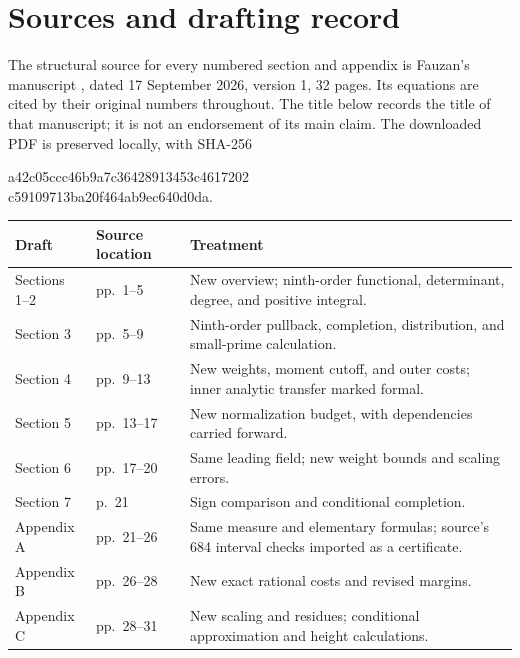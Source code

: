 \begingroup
\small
\section*{Sources and drafting record}

The structural source for every numbered section and appendix is
Fauzan's manuscript \cite{F}, dated 17 September 2026, version 1,
32 pages. Its equations are cited by their original numbers throughout.
The title below records the title of that manuscript; it is not an
endorsement of its main claim. The downloaded PDF is preserved locally,
with SHA-256
\begin{center}\small\ttfamily
a42c05ccc46b9a7c36428913453c4617202\\
c59109713ba20f464ab9ec640d0da.
\end{center}

\begin{center}
\small
\begin{tabular}{@{}>{\raggedright\arraybackslash}p{}>{\raggedright\arraybackslash}p{}>{\raggedright\arraybackslash}p{}@{}}
\toprule
Draft & Source location & Treatment\\
\midrule
Sections 1--2 & pp.~1--5 & New overview; ninth-order functional, determinant, degree, and positive integral.\\
Section 3 & pp.~5--9 & Ninth-order pullback, completion, distribution, and small-prime calculation.\\
Section 4 & pp.~9--13 & New weights, moment cutoff, and outer costs; inner analytic transfer marked formal.\\
Section 5 & pp.~13--17 & New normalization budget, with dependencies carried forward.\\
Section 6 & pp.~17--20 & Same leading field; new weight bounds and scaling errors.\\
Section 7 & p.~21 & Sign comparison and conditional completion.\\
Appendix A & pp.~21--26 & Same measure and elementary formulas; source's 684 interval checks imported as a certificate.\\
Appendix B & pp.~26--28 & New exact rational costs and revised margins.\\
Appendix C & pp.~28--31 & New scaling and residues; conditional approximation and height calculations.\\
\bottomrule
\end{tabular}
\end{center}

